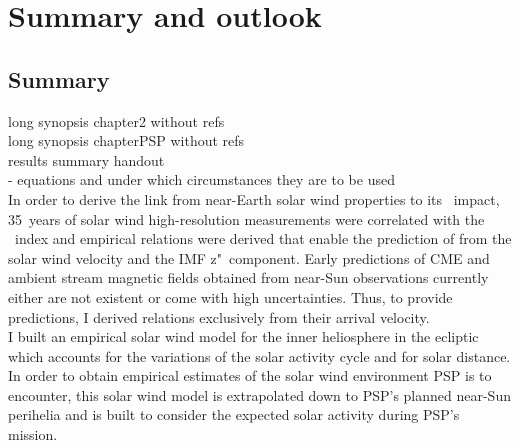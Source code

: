 
\chapter{Summary and outlook}
\label{chap:summary}


% 

\section{Summary}

long synopsis chapter2 without refs\\

long synopsis chapterPSP without refs\\

results summary handout\\
- equations and under which circumstances they are to be used\\



In order to derive the link from near-Earth solar wind properties to its \Kp{}~impact, 35~years of solar wind high-resolution measurements were correlated with the \Kp~index and empirical relations were derived that enable the prediction of \Kp{} from the solar wind velocity and the IMF z"~component. Early predictions of CME and ambient stream magnetic fields obtained from near-Sun observations currently either are not existent or come with high uncertainties. Thus, to provide \Kp{} predictions, I derived relations exclusively from their arrival velocity.\\


I built an empirical solar wind model for the inner heliosphere in the ecliptic which accounts for the variations of the solar activity cycle and for solar distance. In order to obtain empirical estimates of the solar wind environment PSP is to encounter, this solar wind model is extrapolated down to PSP's planned near-Sun perihelia and is built to consider the expected solar activity during PSP's mission.\\



